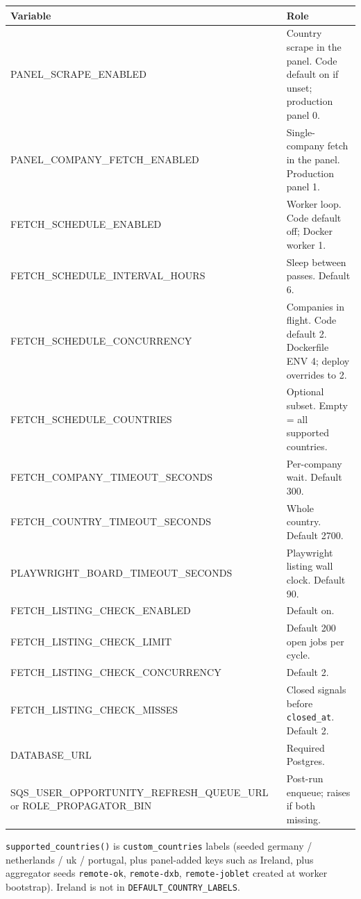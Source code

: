 \documentclass[11pt,a4paper]{article}
\begin{document}
\begin{center}
\small
\begin{tabularx}{\textwidth}{>{\ttfamily}l X}
  \toprule
  \textrm{\textbf{Variable}} & \textrm{\textbf{Role}} \\
  \midrule
  PANEL\_SCRAPE\_ENABLED &
    Country scrape in the panel. Code default on if unset; production panel 0. \\
  PANEL\_COMPANY\_FETCH\_ENABLED &
    Single-company fetch in the panel. Production panel 1. \\
  FETCH\_SCHEDULE\_ENABLED &
    Worker loop. Code default off; Docker worker 1. \\
  FETCH\_SCHEDULE\_INTERVAL\_HOURS &
    Sleep between passes. Default 6. \\
  FETCH\_SCHEDULE\_CONCURRENCY &
    Companies in flight. Code default 2.
    Dockerfile ENV 4; deploy overrides to 2. \\
  FETCH\_SCHEDULE\_COUNTRIES &
    Optional subset. Empty = all supported countries. \\
  FETCH\_COMPANY\_TIMEOUT\_SECONDS &
    Per-company wait. Default 300. \\
  FETCH\_COUNTRY\_TIMEOUT\_SECONDS &
    Whole country. Default 2700. \\
  PLAYWRIGHT\_BOARD\_TIMEOUT\_SECONDS &
    Playwright listing wall clock. Default 90. \\
  FETCH\_LISTING\_CHECK\_ENABLED &
    Default on. \\
  FETCH\_LISTING\_CHECK\_LIMIT &
    Default 200 open jobs per cycle. \\
  FETCH\_LISTING\_CHECK\_CONCURRENCY &
    Default 2. \\
  FETCH\_LISTING\_CHECK\_MISSES &
    Closed signals before \texttt{closed\_at}. Default 2. \\
  DATABASE\_URL &
    Required Postgres. \\
  SQS\_USER\_OPPORTUNITY\_REFRESH\_QUEUE\_URL
  or ROLE\_PROPAGATOR\_BIN &
    Post-run enqueue; raises if both missing. \\
  \bottomrule
\end{tabularx}
\end{center}

\texttt{supported\_countries()} is \texttt{custom\_countries} labels (seeded
germany / netherlands / uk / portugal, plus panel-added keys such as Ireland,
plus aggregator seeds \texttt{remote-ok}, \texttt{remote-dxb},
\texttt{remote-joblet} created at worker bootstrap). Ireland is not in
\texttt{DEFAULT\_COUNTRY\_LABELS}.
\end{document}
